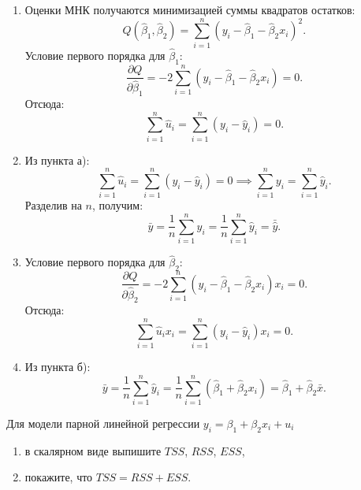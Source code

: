 \documentclass[12pt]{article}
\newcommand{\hb}{\hat{\beta}}
\newcommand{\hu}{\hat{u}}
\newcommand{\hy}{\hat{y}}
\newcommand{\RSS}{RSS}
\newcommand{\ESS}{ESS}
\newcommand{\TSS}{TSS}
\begin{document}
\begin{sol}
\begin{enumerate}
    \item Оценки МНК получаются минимизацией суммы квадратов остатков:
\[
Q(\hb_1, \hb_2) = \sum^n_{i=1} (y_i - \hb_1 - \hb_2 x_i)^2.
\]
Условие первого порядка для $\hb_1$:
\[
\frac{\partial Q}{\partial \hb_1} = -2 \sum^n_{i=1} (y_i - \hb_1 - \hb_2 x_i) = 0.
\]
Отсюда:
\[
\sum^n_{i=1} \hu_i = \sum^n_{i=1} (y_i - \hy_i) = 0.
\]

\item Из пункта а):
\[
\sum^n_{i=1} \hu_i = \sum^n_{i=1} (y_i - \hy_i) = 0 \implies \sum^n_{i=1} y_i = \sum^n_{i=1} \hy_i.
\]
Разделив на $n$, получим:
\[
\bar{y} = \frac{1}{n} \sum^n_{i=1} y_i = \frac{1}{n} \sum^n_{i=1} \hy_i = \bar{\hat{y}}.
\]
\item Условие первого порядка для $\hb_2$:
\[
\frac{\partial Q}{\partial \hb_2} = -2 \sum^n_{i=1} (y_i - \hb_1 - \hb_2 x_i) x_i = 0.
\]
Отсюда:
\[
\sum^n_{i=1} \hu_i x_i = \sum^n_{i=1} (y_i - \hy_i) x_i = 0.
\]

\item Из пункта б):
\[
\bar{y} = \frac{1}{n} \sum^n_{i=1} \hy_i = \frac{1}{n} \sum^n_{i=1} (\hb_1 + \hb_2 x_i) = \hb_1 + \hb_2 \bar{x}.
\]
\end{enumerate}
\end{sol}

\begin{problem}
    Для модели парной линейной регрессии  $y_i = \beta_1 + \beta_2 x_i + u_i$

    \begin{enumerate}
        \item в скалярном виде выпишите $\TSS$, $\RSS$, $\ESS$,
        \item покажите, что $\TSS = \RSS + \ESS$.
    \end{enumerate}
\end{problem}
\end{document}
